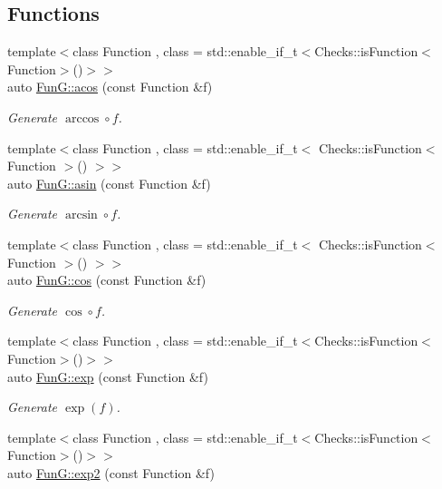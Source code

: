 \subsection*{Functions}
\begin{DoxyCompactItemize}
\item 
{\footnotesize template$<$class Function , class  = std\+::enable\+\_\+if\+\_\+t$<$\+Checks\+::is\+Function$<$\+Function$>$()$>$$>$ }\\auto \hyperlink{group__CMathGroup_gae9b7d3a479bcd8d48cf25f1c29edefb9}{Fun\+G\+::acos} (const Function \&f)
\begin{DoxyCompactList}\small\item\em Generate $ \arccos\circ f $. \end{DoxyCompactList}\item 
{\footnotesize template$<$class Function , class  = std\+::enable\+\_\+if\+\_\+t$<$ Checks\+::is\+Function$<$ Function $>$() $>$$>$ }\\auto \hyperlink{group__CMathGroup_gad26443b289325876cffdaadfca770d51}{Fun\+G\+::asin} (const Function \&f)
\begin{DoxyCompactList}\small\item\em Generate $ \arcsin\circ f $. \end{DoxyCompactList}\item 
{\footnotesize template$<$class Function , class  = std\+::enable\+\_\+if\+\_\+t$<$ Checks\+::is\+Function$<$ Function $>$() $>$$>$ }\\auto \hyperlink{group__CMathGroup_ga7e9b2ac717cd2350663293cb66ba6cbd}{Fun\+G\+::cos} (const Function \&f)
\begin{DoxyCompactList}\small\item\em Generate $ \cos\circ f $. \end{DoxyCompactList}\item 
{\footnotesize template$<$class Function , class  = std\+::enable\+\_\+if\+\_\+t$<$\+Checks\+::is\+Function$<$\+Function$>$()$>$$>$ }\\auto \hyperlink{group__CMathGroup_ga00135c8521411f13813f9b972ea4e231}{Fun\+G\+::exp} (const Function \&f)
\begin{DoxyCompactList}\small\item\em Generate $ \exp(f) $. \end{DoxyCompactList}\item 
{\footnotesize template$<$class Function , class  = std\+::enable\+\_\+if\+\_\+t$<$\+Checks\+::is\+Function$<$\+Function$>$()$>$$>$ }\\auto \hyperlink{group__CMathGroup_ga7724faf7db6e9583ac91df322c26ecf5}{Fun\+G\+::exp2} (const Function \&f)

\end{DoxyCompactItemize}
